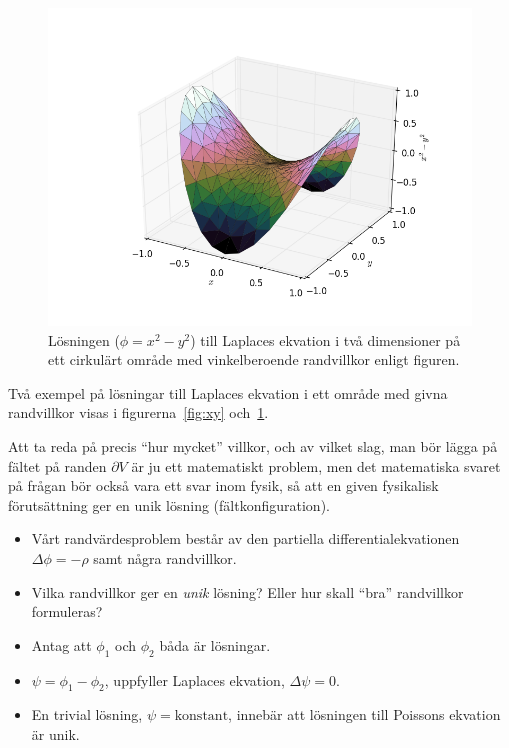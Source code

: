 \documentclass[%
oneside,                 %
final,                   %
10pt]{article}
\newenvironment{warning_mdfboxadmon}[1][]{
\begin{warning_mdfboxmdframed}[frametitle=#1]
}
{
\end{warning_mdfboxmdframed}
}
\begin{document}
\begin{figure}[!ht]  %
  \centerline{\includegraphics[width=0.8\linewidth]{fig/x2y2.png}}
  \caption{
  Lösningen ($\phi = x^2 - y^2$) till Laplaces ekvation i två dimensioner på ett cirkulärt område med vinkelberoende randvillkor enligt figuren. \label{fig:x2y2}
  }
\end{figure}


Två exempel på lösningar till Laplaces ekvation i ett område med givna randvillkor visas i figurerna~\ref{fig:xy} och~\ref{fig:x2y2}.



\begin{warning_mdfboxadmon}[Kommentar]
Att ta reda på precis ``hur mycket'' villkor, och av vilket slag, man bör lägga på fältet på randen $\partial V$ är ju ett matematiskt problem, men det matematiska svaret på frågan bör också vara ett svar inom fysik, så att en given fysikalisk förutsättning ger en unik lösning (fältkonfiguration).
\end{warning_mdfboxadmon} %



\begin{itemize}
\item Vårt randvärdesproblem består av den partiella differentialekvationen $\Delta\phi=-\rho$ samt några randvillkor. 

\item Vilka randvillkor ger en \emph{unik} lösning? Eller hur skall ``bra'' randvillkor formuleras? 

\item Antag att $\phi_1$ och $\phi_2$ båda är lösningar. 

\item $\psi=\phi_1-\phi_2$, uppfyller Laplaces ekvation, $\Delta\psi=0$. 

\item En trivial lösning, $\psi=\mathrm{konstant}$, innebär att lösningen till Poissons ekvation är unik.
\end{itemize}
\end{document}
